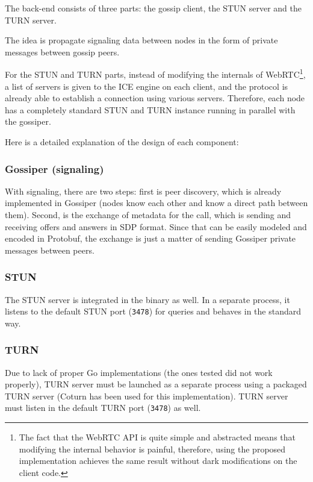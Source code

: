 \documentclass[paper=a4, fontsize=11pt]{scrartcl} %
\numberwithin{equation}{section} %
\numberwithin{figure}{section} %
\numberwithin{table}{section} %
\begin{document}
The back-end consists of three parts: the gossip client, the STUN server and the TURN server. 

The idea is propagate signaling data between nodes in the form of private messages between gossip peers. 

For the STUN and TURN parts, instead of modifying the internals of WebRTC\footnote{The fact that the WebRTC API is quite simple and abstracted means that modifying the internal behavior is painful, therefore, using the proposed implementation achieves the same result without dark modifications on the client code.}, a list of servers is given to the ICE engine on each client, and the protocol is already able to establish a connection using various servers. Therefore, each node has a completely standard STUN and TURN instance running in parallel with the gossiper.

Here is a detailed explanation of the design of each component:

\subsubsection{Gossiper (signaling)}

With signaling, there are two steps: first is peer discovery, which is already implemented in Gossiper (nodes know each other and know a direct path between them). Second, is the exchange of metadata for the call, which is sending and receiving offers and answers in SDP format. Since that can be easily modeled and encoded in Protobuf, the exchange is just a matter of sending Gossiper private messages between peers.


\subsubsection{STUN}

The STUN server is integrated in the binary as well. In a separate process, it listens to the default STUN port (\verb|3478|) for queries and behaves in the standard way.

\subsubsection{TURN}

Due to lack of proper Go implementations (the ones tested did not work properly), TURN server must be launched as a separate process using a packaged TURN server (Coturn has been used for this implementation). TURN server must listen in the default TURN port (\verb|3478|) as well.
\end{document}
